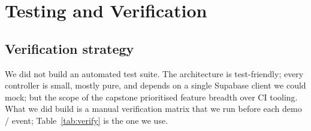 \section{Testing and Verification}
\label{sec:test}

\subsection{Verification strategy}

We did not build an automated test suite. The architecture is
test-friendly; every controller is small, mostly pure, and depends on
a single Supabase client we could mock; but the scope of the capstone
prioritised feature breadth over CI tooling. What we did build is a
manual verification matrix that we run before each demo / event;
Table~\ref{tab:verify} is the one we use.

